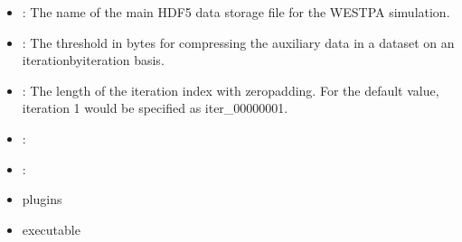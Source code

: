 \documentclass[letterpaper,10pt,english]{sphinxmanual}
\begin{document}
\begin{itemize}
\begin{sphinxVerbatim}[commandchars=\\\{\}]
         
         
         
             
              
              
              
              
              
\end{sphinxVerbatim}

\item {} 
: The name of the main HDF5 data storage file for the
WESTPA simulation.

\item {} 
: The threshold in bytes for compressing the
auxiliary data in a dataset on an iteration\sphinxhyphen{}by\sphinxhyphen{}iteration basis.

\item {} 
: The length of the iteration index with zero\sphinxhyphen{}padding. For the
default value, iteration 1 would be specified as iter\_00000001.

\item {} 
:

\item {} 
:

\item {} 
plugins

\item {} 
executable

\end{itemize}
\end{document}
